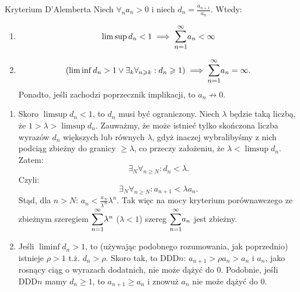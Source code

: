 \documentclass{article}
\numberwithin{defi}{section}
\numberwithin{defi}{section}
\newcommand{\oo}{\infty}
\renewcommand{\geq}{\geqslant}
\newcommand{\bsum}[2]{\mathlarger{\sum_{#1}^{#2}}}
\newcommand{\szerI}[1]{\bsum{n=1}{\oo} #1_n}
\begin{document}
\begin{twier}{Kryterium D'Alemberta}
    Niech $\forall_n a_n > 0$ i niech $d_n = \frac{a_{n+1}}{a_n}$. Wtedy: \begin{enumerate}
        \item \begin{equation}
            \limsup d_n < 1 \implies \szerI{a} < \oo
        \end{equation}
        \item \begin{equation}
            (\liminf d_n > 1 \vee \exists_k \forall_{n \geqslant k}: d_n \geqslant 1) \implies \szerI{a} = \oo.
        \end{equation} Ponadto, jeśli zachodzi poprzecznik implikacji, to $a_n \not \to 0$.
    \end{enumerate}
\end{twier} 
\begin{dow}
    \begin{enumerate}
        \item Skoro $\limsup d_n < 1$, to $d_n$ musi być ograniczony. Niech $\lambda$ będzie taką liczbą, że $1 > \lambda > \limsup d_n$. Zauważmy, że może istnieć tylko skończona liczba wyrazów $d_n$ większych lub równych $\lambda$, gdyż inaczej wybralibyśmy z nich podciąg zbieżny do granicy $\geq \lambda$, co przeczy założeniu, że $\lambda < \limsup d_n$. Zatem: \begin{equation*}
            \exists_{N} \forall_{n \geq N}: d_n < \lambda.
        \end{equation*} Czyli: \begin{equation*}
            \exists_{N} \forall_{n \geq N}: a_{n+1} < \lambda a_n.
        \end{equation*} Stąd, dla $n > N$: $a_{n} < \frac{a_N}{\lambda^N} \lambda^n$. Tak więc na mocy kryterium porównawczego ze zbieżnym szeregiem $\bsum{n=1}{\oo}\lambda^n$ ($\lambda < 1$) szereg $\szerI{a}$ jest zbieżny.

        \item Jeśli $\liminf d_n > 1$, to (używając podobnego rozumowania, jak poprzednio) istnieje $\rho > 1$ t.ż. $d_n > \rho$. Skoro tak, to DDD$n$: $a_{n+1} > \rho a_n > a_n$ i $a_n$, jako rosnący ciąg o wyrazach dodatnich, nie może dążyć do 0. Podobnie, jeśli DDD$n$ mamy $d_n \geq 1$, to $a_{n+1} \geq a_n$ i znowuż $a_n$ nie może dążyć do $0$.
    \end{enumerate}
\end{dow}
\end{document}
